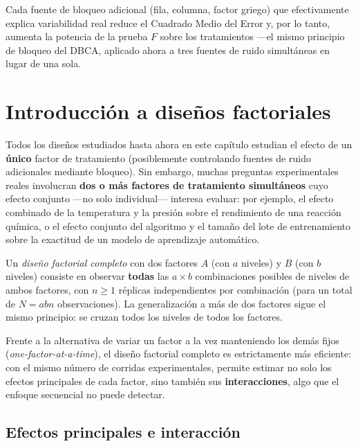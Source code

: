 \begin{observacion}
	Cada fuente de bloqueo adicional (fila, columna, factor griego) que efectivamente explica variabilidad real reduce el Cuadrado Medio del Error y, por lo tanto, aumenta la potencia de la prueba $F$ sobre los tratamientos —el mismo principio de bloqueo del DBCA, aplicado ahora a tres fuentes de ruido simultáneas en lugar de una sola.
\end{observacion}

\section{Introducción a diseños factoriales}

Todos los diseños estudiados hasta ahora en este capítulo estudian el efecto de un \textbf{único} factor de tratamiento (posiblemente controlando fuentes de ruido adicionales mediante bloqueo). Sin embargo, muchas preguntas experimentales reales involucran \textbf{dos o más factores de tratamiento simultáneos} cuyo efecto conjunto —no solo individual— interesa evaluar: por ejemplo, el efecto combinado de la temperatura y la presión sobre el rendimiento de una reacción química, o el efecto conjunto del algoritmo y el tamaño del lote de entrenamiento sobre la exactitud de un modelo de aprendizaje automático.

\begin{definicion}
	Un \emph{diseño factorial completo} con dos factores $A$ (con $a$ niveles) y $B$ (con $b$ niveles) consiste en observar \textbf{todas} las $a \times b$ combinaciones posibles de niveles de ambos factores, con $n \geq 1$ réplicas independientes por combinación (para un total de $N = abn$ observaciones). La generalización a más de dos factores sigue el mismo principio: se cruzan todos los niveles de todos los factores.
\end{definicion}

\begin{observacion}
	Frente a la alternativa de variar un factor a la vez manteniendo los demás fijos (\emph{one-factor-at-a-time}), el diseño factorial completo es estrictamente más eficiente: con el mismo número de corridas experimentales, permite estimar no solo los efectos principales de cada factor, sino también sus \textbf{interacciones}, algo que el enfoque secuencial no puede detectar.
\end{observacion}

\subsection{Efectos principales e interacción}

